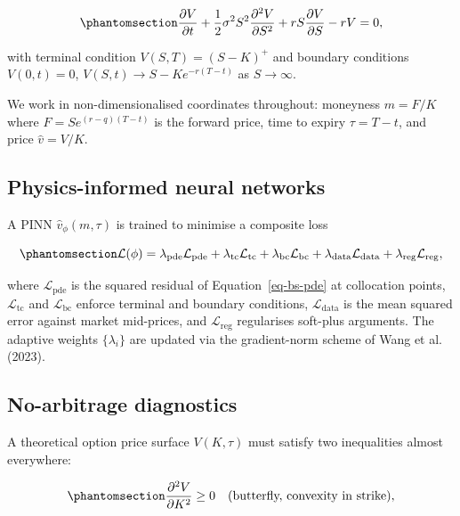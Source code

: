 \documentclass[
  11pt,
]{article}
\begin{document}
\begin{equation}\phantomsection\label{eq-bs-pde}{
\frac{\partial V}{\partial t}
+ \frac{1}{2}\sigma^2 S^2 \frac{\partial^2 V}{\partial S^2}
+ r S \frac{\partial V}{\partial S} - r V = 0,
}\end{equation}

with terminal condition \(V(S, T) = (S - K)^+\) and boundary conditions
\(V(0, t) = 0\), \(V(S, t) \to S - K e^{-r(T-t)}\) as \(S \to \infty\).

We work in non-dimensionalised coordinates throughout: moneyness
\(m = F/K\) where \(F = S e^{(r-q)(T-t)}\) is the forward price, time to
expiry \(\tau = T - t\), and price \(\hat v = V/K\).

\subsection{Physics-informed neural
networks}\label{physics-informed-neural-networks}

A PINN \(\hat v_\phi(m,\tau)\) is trained to minimise a composite loss

\begin{equation}\phantomsection\label{eq-loss}{
\mathcal{L}(\phi) = \lambda_\mathrm{pde}\mathcal{L}_\mathrm{pde}
+ \lambda_\mathrm{tc}\mathcal{L}_\mathrm{tc}
+ \lambda_\mathrm{bc}\mathcal{L}_\mathrm{bc}
+ \lambda_\mathrm{data}\mathcal{L}_\mathrm{data}
+ \lambda_\mathrm{reg}\mathcal{L}_\mathrm{reg},
}\end{equation}

where \(\mathcal{L}_\mathrm{pde}\) is the squared residual of
Equation~\ref{eq-bs-pde} at collocation points,
\(\mathcal{L}_\mathrm{tc}\) and \(\mathcal{L}_\mathrm{bc}\) enforce
terminal and boundary conditions, \(\mathcal{L}_\mathrm{data}\) is the
mean squared error against market mid-prices, and
\(\mathcal{L}_\mathrm{reg}\) regularises soft-plus arguments. The
adaptive weights \(\{\lambda_i\}\) are updated via the gradient-norm
scheme of Wang et al. (2023).

\subsection{No-arbitrage diagnostics}\label{no-arbitrage-diagnostics}

A theoretical option price surface \(V(K,\tau)\) must satisfy two
inequalities almost everywhere:

\begin{equation}\phantomsection\label{eq-butterfly}{
\frac{\partial^2 V}{\partial K^2} \ge 0
\quad\text{(butterfly, convexity in strike)},
}\end{equation}
\end{document}
